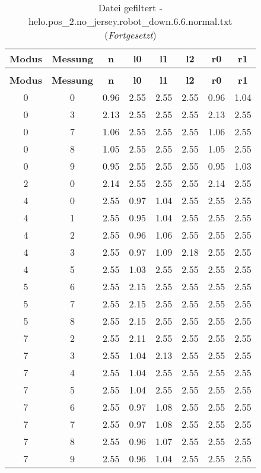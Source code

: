 \begin{longtable}{|c|c||c||c|c|c||c|c|}
	\caption{Datei gefiltert - helo.pos\_2.no\_jersey.robot\_down.6.6.normal.txt} \label{tab:helo.pos-2.no-jersey.robot-down.6.6.normal.txt} \\ \hline
	\textbf{Modus} & \textbf{Messung} & \textbf{n} & \textbf{l0} & \textbf{l1} & \textbf{l2} & \textbf{r0} & \textbf{r1}\\ \hline
	\endfirsthead
	\caption[]{Datei gefiltert - helo.pos\_2.no\_jersey.robot\_down.6.6.normal.txt (\emph{Fortgesetzt})} \\ \hline
	\textbf{Modus} & \textbf{Messung} & \textbf{n} & \textbf{l0} & \textbf{l1} & \textbf{l2} & \textbf{r0} & \textbf{r1}\\ \hline
	\endhead
	0 & 0 & 0.96 & 2.55 & 2.55 & 2.55 & 0.96 & 1.04 \\ \hline
	0 & 3 & 2.13 & 2.55 & 2.55 & 2.55 & 2.13 & 2.55 \\ \hline
	0 & 7 & 1.06 & 2.55 & 2.55 & 2.55 & 1.06 & 2.55 \\ \hline
	0 & 8 & 1.05 & 2.55 & 2.55 & 2.55 & 1.05 & 2.55 \\ \hline
	0 & 9 & 0.95 & 2.55 & 2.55 & 2.55 & 0.95 & 1.03 \\ \hline
	2 & 0 & 2.14 & 2.55 & 2.55 & 2.55 & 2.14 & 2.55 \\ \hline
	4 & 0 & 2.55 & 0.97 & 1.04 & 2.55 & 2.55 & 2.55 \\ \hline
	4 & 1 & 2.55 & 0.95 & 1.04 & 2.55 & 2.55 & 2.55 \\ \hline
	4 & 2 & 2.55 & 0.96 & 1.06 & 2.55 & 2.55 & 2.55 \\ \hline
	4 & 3 & 2.55 & 0.97 & 1.09 & 2.18 & 2.55 & 2.55 \\ \hline
	4 & 5 & 2.55 & 1.03 & 2.55 & 2.55 & 2.55 & 2.55 \\ \hline
	5 & 6 & 2.55 & 2.15 & 2.55 & 2.55 & 2.55 & 2.55 \\ \hline
	5 & 7 & 2.55 & 2.15 & 2.55 & 2.55 & 2.55 & 2.55 \\ \hline
	5 & 8 & 2.55 & 2.15 & 2.55 & 2.55 & 2.55 & 2.55 \\ \hline
	7 & 2 & 2.55 & 2.11 & 2.55 & 2.55 & 2.55 & 2.55 \\ \hline
	7 & 3 & 2.55 & 1.04 & 2.13 & 2.55 & 2.55 & 2.55 \\ \hline
	7 & 4 & 2.55 & 1.04 & 2.55 & 2.55 & 2.55 & 2.55 \\ \hline
	7 & 5 & 2.55 & 1.04 & 2.55 & 2.55 & 2.55 & 2.55 \\ \hline
	7 & 6 & 2.55 & 0.97 & 1.08 & 2.55 & 2.55 & 2.55 \\ \hline
	7 & 7 & 2.55 & 0.97 & 1.08 & 2.55 & 2.55 & 2.55 \\ \hline
	7 & 8 & 2.55 & 0.96 & 1.07 & 2.55 & 2.55 & 2.55 \\ \hline
	7 & 9 & 2.55 & 0.96 & 1.04 & 2.55 & 2.55 & 2.55 \\ \hline
\end{longtable}
